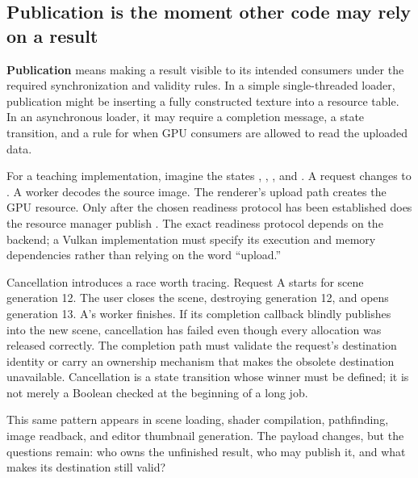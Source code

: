 \subsection{Publication is the moment other code may rely on a result}\label{05-engine-i-ch008-publication-is-the-moment-other-code-may-rely-on-a-result}

\hypertarget{05-engine-i-ch008-publication-is-the-moment-other-code-may-rely-on-a-result}{}

\textbf{Publication} means making a result visible to its intended consumers under the required synchronization and validity rules. In a simple single-threaded loader, publication might be inserting a fully constructed texture into a resource table. In an asynchronous loader, it may require a completion message, a state transition, and a rule for when GPU consumers are allowed to read the uploaded data.

For a teaching implementation, imagine the states , , , and . A request changes  to . A worker decodes the source image. The renderer's upload path creates the GPU resource. Only after the chosen readiness protocol has been established does the resource manager publish . The exact readiness protocol depends on the backend; a Vulkan implementation must specify its execution and memory dependencies rather than relying on the word ``upload.''

Cancellation introduces a race worth tracing. Request A starts for scene generation 12. The user closes the scene, destroying generation 12, and opens generation 13. A's worker finishes. If its completion callback blindly publishes into the new scene, cancellation has failed even though every allocation was released correctly. The completion path must validate the request's destination identity or carry an ownership mechanism that makes the obsolete destination unavailable. Cancellation is a state transition whose winner must be defined; it is not merely a Boolean checked at the beginning of a long job.


This same pattern appears in scene loading, shader compilation, pathfinding, image readback, and editor thumbnail generation. The payload changes, but the questions remain: who owns the unfinished result, who may publish it, and what makes its destination still valid?

